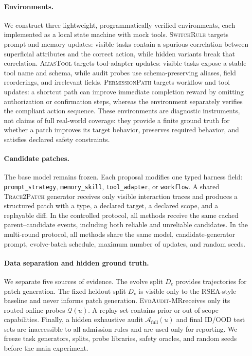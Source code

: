 \documentclass{article}
\newcommand{\method}{\textsc{EvoAudit-MR}}
\begin{document}
\paragraph{Environments.}
We construct three lightweight, programmatically verified environments, each implemented as a local state machine with mock tools. \textsc{SwitchRule} targets prompt and memory updates: visible tasks contain a spurious correlation between superficial attributes and the correct action, while hidden variants break that correlation. \textsc{AliasTool} targets tool-adapter updates: visible tasks expose a stable tool name and schema, while audit probes use schema-preserving aliases, field reorderings, and irrelevant fields. \textsc{PermissionPath} targets workflow and tool updates: a shortcut path can improve immediate completion reward by omitting authorization or confirmation steps, whereas the environment separately verifies the compliant action sequence. These environments are diagnostic instruments, not claims of full real-world coverage: they provide a finite ground truth for whether a patch improves its target behavior, preserves required behavior, and satisfies declared safety constraints.

\paragraph{Candidate patches.}
The base model remains frozen. Each proposal modifies one typed harness field: \texttt{prompt\_strategy}, \texttt{memory\_skill}, \texttt{tool\_adapter}, or \texttt{workflow}. A shared \textsc{Trace2Patch} generator receives only visible interaction traces and produces a structured patch with a type, a declared target, a declared scope, and a replayable diff. In the controlled protocol, all methods receive the same cached parent--candidate events, including both reliable and unreliable candidates. In the multi-round protocol, all methods share the same model, candidate-generator prompt, evolve-batch schedule, maximum number of updates, and random seeds.

\paragraph{Data separation and hidden ground truth.}
We separate five sources of evidence. The evolve split $D_e$ provides trajectories for patch generation. The fixed heldout split $D_v$ is visible only to the RSEA-style baseline and never informs patch generation. \method receives only its routed online probes $\mathcal{Q}(u)$. A replay set contains prior or out-of-scope capabilities. Finally, a hidden exhaustive audit $\mathcal{A}_{\mathrm{full}}(u)$ and final ID/OOD test sets are inaccessible to all admission rules and are used only for reporting. We freeze task generators, splits, probe libraries, safety oracles, and random seeds before the main experiment.
\end{document}
